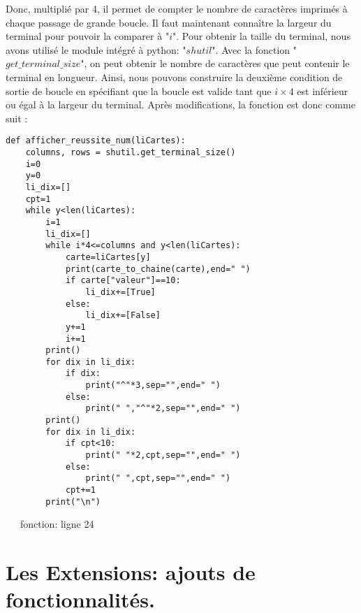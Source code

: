 \documentclass[10pt,a4paper,french,titlepage]{article}
\theoremstyle{definition}
\begin{document}
Donc, multiplié par 4, il permet de compter le nombre de caractères imprimés à chaque passage de grande boucle. Il faut maintenant connaître la largeur du terminal pour pouvoir la comparer à "$i$". Pour obtenir la taille du terminal, nous avons utilisé le module intégré à python: "$shutil$". Avec la fonction "$get\_terminal\_size$", on peut obtenir le nombre de caractères que peut  contenir le terminal en longueur. Ainsi, nous pouvons construire la deuxième condition de sortie de boucle en spécifiant que la boucle est valide tant que $i \times 4$ est inférieur ou égal à la largeur du terminal. Après modifications, la fonction est donc comme suit :
\begin{lstlisting}
def afficher_reussite_num(liCartes):
    columns, rows = shutil.get_terminal_size()
    i=0
    y=0
    li_dix=[]
    cpt=1
    while y<len(liCartes):
        i=1
        li_dix=[]
        while i*4<=columns and y<len(liCartes): 
            carte=liCartes[y]
            print(carte_to_chaine(carte),end=" ")
            if carte["valeur"]==10:
                li_dix+=[True]
            else:
                li_dix+=[False]
            y+=1
            i+=1
        print()
        for dix in li_dix:
            if dix:
                print("^"*3,sep="",end=" ")
            else:
                print(" ","^"*2,sep="",end=" ")
        print()
        for dix in li_dix:
            if cpt<10:
                print(" "*2,cpt,sep="",end=" ")
            else:
                print(" ",cpt,sep="",end=" ")
            cpt+=1
        print("\n")
\end{lstlisting}
~~~fonction: ligne 24



\section{Les Extensions: ajouts de fonctionnalités.}
\end{document}
